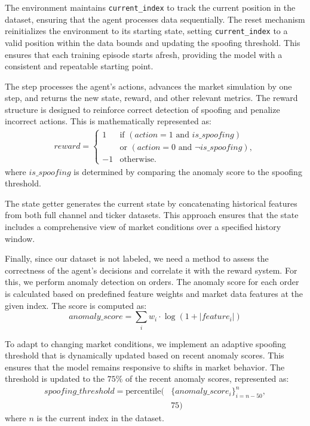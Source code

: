 \documentclass[conference]{IEEEtran}
\begin{document}
\par The environment maintains \texttt{current\_index} to track the current position in the dataset, ensuring that the agent processes data sequentially. The  reset mechanism reinitializes the environment to its starting state, setting \texttt{current\_index} to a valid position within the data bounds and updating the spoofing threshold. This ensures that each training episode starts afresh, providing the model with a consistent and repeatable starting point.

\par The step processes the agent's actions, advances the market simulation by one step, and returns the new state, reward, and other relevant metrics. The reward structure is designed to reinforce correct detection of spoofing and penalize incorrect actions. This is mathematically represented as:
\begin{equation}
\begin{split}
reward = 
\begin{cases} 
1 & \text{if } (action = 1 \text{ and } is\_spoofing) \\
  & \text{or } (action = 0 \text{ and } \neg is\_spoofing), \\
-1 & \text{otherwise.}
\end{cases}
\end{split}
\end{equation}
where $is\_spoofing$ is determined by comparing the anomaly score to the spoofing threshold.

\par The state getter generates the current state by concatenating historical features from both full channel and ticker datasets. This approach ensures that the state includes a comprehensive view of market conditions over a specified history window.

\par Finally, since our dataset is not labeled, we need a method to assess the correctness of the agent's decisions and correlate it with the reward system. For this, we perform anomaly detection on orders. The anomaly score for each order is calculated based on predefined feature weights and market data features at the given index. The score is computed as:
\begin{equation}
anomaly\_score = \sum_{i} w_i \cdot \log(1 + |feature_i|)
\label{eq:anomaly_score}
\end{equation}

\par To adapt to changing market conditions, we implement an adaptive spoofing threshold that is dynamically updated based on recent anomaly scores. This ensures that the model remains responsive to shifts in market behavior. The threshold is updated to the $75\%$ of the recent anomaly scores, represented as:
\begin{equation}
\begin{split}
spoofing\_threshold = \text{percentile}(&\{anomaly\_score_i\}_{i=n-50}^{n}, \\
&75)
\end{split}
\end{equation}
where $n$ is the current index in the dataset.
\end{document}
